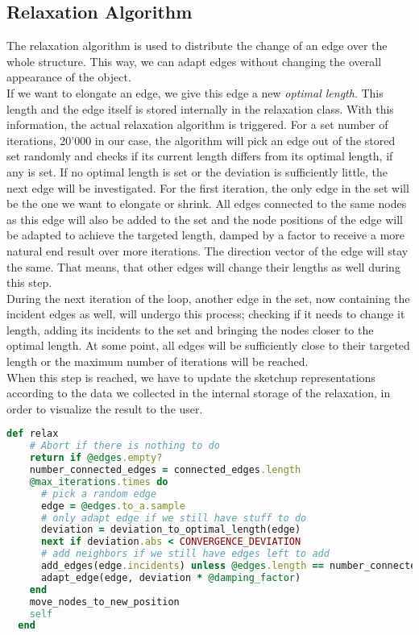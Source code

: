 \subsection{Relaxation Algorithm}\label{sec:relaxation}
The relaxation algorithm is used to distribute the change of an edge over the whole structure. This way, we can adapt edges without changing the overall appearance of the object.\\
If we want to elongate an edge, we give this edge a new \textit{optimal length}. This length and the edge itself is stored internally in the relaxation class. With this information, the actual relaxation algorithm is triggered. For a set number of iterations, 20'000 in our case, the algorithm will pick an edge out of the stored set randomly and checks if its current length differs from its optimal length, if any is set. If no optimal length is set or the deviation is sufficiently little, the next edge will be investigated. For the first iteration, the only edge in the set will be the one we want to elongate or shrink. All edges connected to the same nodes as this edge will also be added to the set and the node positions of the edge will be adapted to achieve the targeted length, damped by a factor to receive a more natural end result over more iterations. The direction vector of the edge will stay the same. That means, that other edges will change their lengths as well during this step.\\
During the next iteration of the loop, another edge in the set, now containing the incident edges as well, will undergo this process; checking if it needs to change it length, adding its incidents to the set and bringing the nodes closer to the optimal length. At some point, all edges will be sufficiently close to their targeted length or the maximum number of iterations will be reached.\\
When this step is reached, we have to update the sketchup representations according to the data we collected in the internal storage of the relaxation, in order to visualize the result to the user.

\begin{lstlisting}[language=Ruby, label={lst:relaxation}, caption=The relaxation algorithm]
def relax
    # Abort if there is nothing to do
    return if @edges.empty?
    number_connected_edges = connected_edges.length
    @max_iterations.times do
      # pick a random edge
      edge = @edges.to_a.sample
      # only adapt edge if we still have stuff to do
      deviation = deviation_to_optimal_length(edge)
      next if deviation.abs < CONVERGENCE_DEVIATION
      # add neighbors if we still have edges left to add
      add_edges(edge.incidents) unless @edges.length == number_connected_edges
      adapt_edge(edge, deviation * @damping_factor)
    end
    move_nodes_to_new_position
    self
  end
\end{lstlisting}

